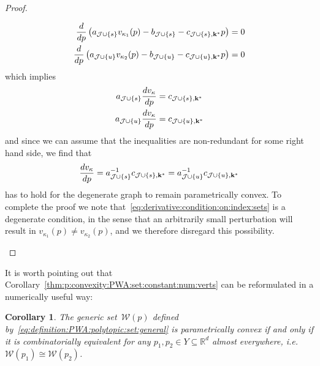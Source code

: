\documentclass{elsarticle}
\newcounter{thmcount}
\newtheorem{cor}[thmcount]{Corollary}
\theoremstyle{remark}
\theoremstyle{definition}
\begin{document}
\begin{proof}
\begin{enumerate}
\begin{align*}
  \frac{d}{dp}\left(  a_{\mathcal J\cup \{s\}} v_{\kappa_1}(p) - b_{\mathcal J\cup \{s\}} - 
  c_{\mathcal J\cup \{s\},{\bf{k}}^\ast} p\right) &= 0\\
  \frac{d}{dp}\left(  a_{\mathcal J\cup \{u\}} v_{\kappa_2}(p) - b_{\mathcal J\cup \{u\}} - 
  c_{\mathcal J\cup \{u\},{\bf{k}}^\ast} p\right) &= 0
\end{align*}
%
which implies
\begin{align*}
  a_{\mathcal J\cup \{s\}} \frac{dv_{\kappa}}{dp} &= c_{\mathcal J\cup \{s\},{\bf{k}}^\ast}\\
  a_{\mathcal J\cup \{u\}} \frac{dv_{\kappa}}{dp} &= c_{\mathcal J\cup \{u\},{\bf{k}}^\ast}
\end{align*}
%
and since we can assume that the inequalities are non-redundant for some right hand side, we find that 
%
\begin{equation}\label{eq:derivative:condition:on:index:sets}
  \frac{dv_\kappa}{dp} = a_{\mathcal J\cup \{s\}}^{-1}c_{\mathcal J\cup \{s\},{\bf{k}}^\ast} = 
  a_{\mathcal J\cup \{u\}}^{-1}c_{\mathcal J\cup \{u\},{\bf{k}}^\ast}
\end{equation}
%
has to hold for the degenerate graph to remain parametrically convex.
%
To complete the proof we note that~\eqref{eq:derivative:condition:on:index:sets} is a degenerate condition, in the sense that an arbitrarily small perturbation will result in $v_{\kappa_1}(p) \neq v_{\kappa_2}(p)$, and we therefore disregard this possibility.
\end{enumerate}
\baselineskip
\end{proof}
%
It is worth pointing out that Corollary~\ref{thm:p:convexity:PWA:set:constant:num:verts} can be reformulated in a numerically useful way:
%
\begin{cor}\label{thm:combinatorical:equivalence:alternative}
The generic set~$\mathcal W(p)$ defined by~\eqref{eq:definition:PWA:polytopic:set:general} is parametrically convex if and only if it is combinatorially equivalent for any $p_1,p_2\in Y\subseteq\mathbb R^d$ almost everywhere, i.e.\ $\mathcal W(p_1)\cong\mathcal W(p_2)$.
\end{cor}
%
\end{document}

